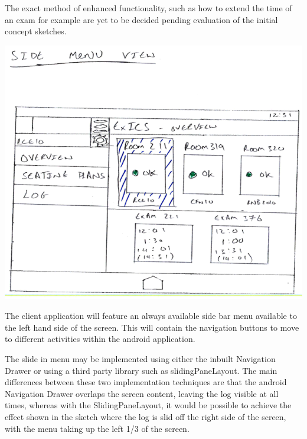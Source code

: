 \documentclass[a4paper, 12pt, notitlepage]{report}
\begin{document}
The exact method of enhanced functionality, such as how to extend the time of an exam for example are yet to be decided pending evaluation of the initial concept sketches.

\includegraphics[width=\textwidth]{"GUI Sketches/Side Menu View Cropped"}

The client application will feature an always available side bar menu available to the left hand side of the screen.  This will contain the navigation buttons to move to different activities within the android application.

The slide in menu may be implemented using either the inbuilt Navigation Drawer\cite{navdrawer} or using a third party library such as slidingPaneLayout\cite{spl}.  The main differences between these two implementation techniques are that the android Navigation Drawer overlaps the screen content, leaving the log visible at all times, whereas with the SlidingPaneLayout, it would be possible to achieve the effect shown in the sketch where the log is slid off the right side of the screen, with the menu taking up the left 1/3 of the screen.
\end{document}
